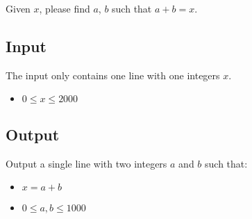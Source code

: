 
Given $x$, please find $a$, $b$ such that $a+b=x$.

\subsection*{Input}

The input only contains one line with one integers $x$.

\begin{itemize}
    \item $0 \leq x \leq 2000$
\end{itemize}

\subsection*{Output}

Output a single line with two integers $a$ and $b$ such that:

\begin{itemize}
    \item $x = a + b$
    \item $0 \leq a, b \leq 1000$
\end{itemize}
